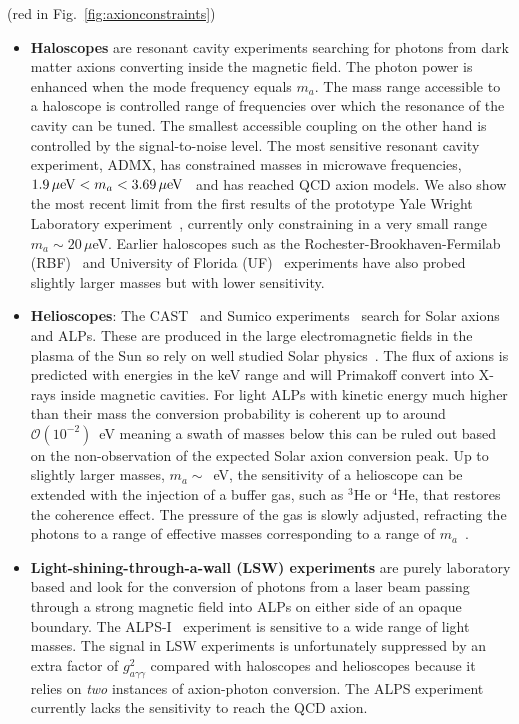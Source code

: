 {\color{Red}{\bf Experimental searches}} (red in Fig.~\ref{fig:axionconstraints})\vspace{-1em}
\begin{itemize} \itemsep0em 
 \item {\bf Haloscopes} are resonant cavity experiments searching for photons from dark matter axions converting inside the magnetic field. The photon power is enhanced when the mode frequency equals $m_a$. The mass range accessible to a haloscope is controlled range of frequencies over which the resonance of the cavity can be tuned. The smallest accessible coupling on the other hand is controlled by the signal-to-noise level. The most sensitive resonant cavity experiment, ADMX, has constrained masses in microwave frequencies, $1.9\,\mu{\rm eV} < m_a < 3.69\,\mu{\rm eV}$~\cite{Asztalos:2009yp,Hoskins:2011iv} and has reached QCD axion models. We also show the most recent limit from the first results of the prototype Yale Wright Laboratory experiment~\cite{Brubaker:2016ktl}, currently only constraining in a very small range $m_a\sim 20\,\mu$eV. Earlier haloscopes such as the Rochester-Brookhaven-Fermilab (RBF)~\cite{DePanfilis:1987dk} and University of Florida (UF)~\cite{Hagmann:1990tj} experiments have also probed slightly larger masses but with lower sensitivity.
 \item {\bf Helioscopes}: The CAST~\cite{Zioutas:2004hi} and Sumico experiments~\cite{Inoue:2002qy} search for Solar axions and ALPs. These are produced in the large electromagnetic fields in the plasma of the Sun so rely on well studied Solar physics~\cite{Redondo:2013wwa}. The flux of axions is predicted with energies in the keV range and will Primakoff convert into X-rays inside magnetic cavities. For light ALPs with kinetic energy much higher than their mass the conversion probability is coherent up to around $\mathcal{O}(10^{-2})$~eV meaning a swath of masses below this can be ruled out based on the non-observation of the expected Solar axion conversion peak. Up to slightly larger masses, $m_a\sim$~eV, the sensitivity of a helioscope can be extended with the injection of a buffer gas, such as $^3$He or $^4$He, that restores the coherence effect. The pressure of the gas is slowly adjusted, refracting the photons to a range of effective masses corresponding to a range of $m_a$~\cite{vanBibber:1988ge}.
 \item {\bf Light-shining-through-a-wall (LSW) experiments} are purely laboratory based and look for the conversion of photons from a laser beam passing through a strong magnetic field into ALPs on either side of an opaque boundary. The ALPS-I~\cite{Bahre:2013ywa} experiment is sensitive to a wide range of light masses. The signal in LSW experiments is unfortunately suppressed by an extra factor of $g_{a\gamma\gamma}^2$ compared with haloscopes and helioscopes because it relies on {\it two} instances of axion-photon conversion. The ALPS experiment currently lacks the sensitivity to reach the QCD axion.

\end{itemize}
